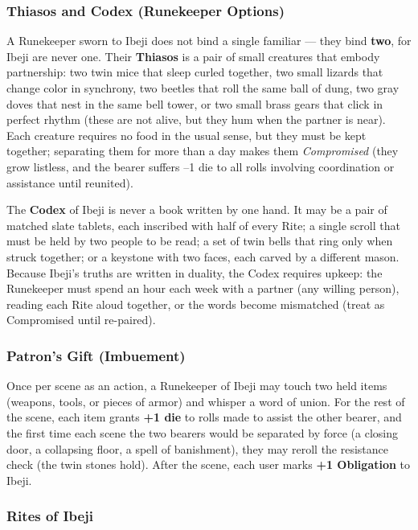 \subsubsection*{Thiasos and Codex (Runekeeper Options)}

A Runekeeper sworn to Ibeji does not bind a single familiar --- they bind \textbf{two}, for Ibeji are never one. Their \textbf{Thiasos} is a pair of small creatures that embody partnership: two twin mice that sleep curled together, two small lizards that change color in synchrony, two beetles that roll the same ball of dung, two gray doves that nest in the same bell tower, or two small brass gears that click in perfect rhythm (these are not alive, but they hum when the partner is near). Each creature requires no food in the usual sense, but they must be kept together; separating them for more than a day makes them \textit{Compromised} (they grow listless, and the bearer suffers --1 die to all rolls involving coordination or assistance until reunited).

The \textbf{Codex} of Ibeji is never a book written by one hand. It may be a pair of matched slate tablets, each inscribed with half of every Rite; a single scroll that must be held by two people to be read; a set of twin bells that ring only when struck together; or a keystone with two faces, each carved by a different mason. Because Ibeji's truths are written in duality, the Codex requires upkeep: the Runekeeper must spend an hour each week with a partner (any willing person), reading each Rite aloud together, or the words become mismatched (treat as Compromised until re-paired).

\subsubsection*{Patron's Gift (Imbuement)}

Once per scene as an action, a Runekeeper of Ibeji may touch two held items (weapons, tools, or pieces of armor) and whisper a word of union. For the rest of the scene, each item grants \textbf{+1 die} to rolls made to assist the other bearer, and the first time each scene the two bearers would be separated by force (a closing door, a collapsing floor, a spell of banishment), they may reroll the resistance check (the twin stones hold). After the scene, each user marks \textbf{+1 Obligation} to Ibeji.

\subsubsection*{Rites of Ibeji}

